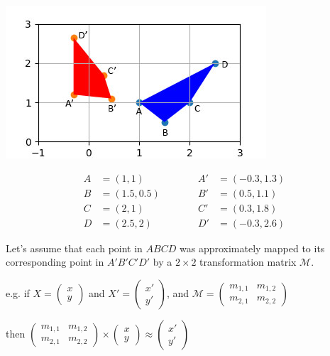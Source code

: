 \includegraphics[width=\textwidth * 5/10]{images/quadrilaterals.jpg}

\begin{equation}
\begin{split}
A&=(1, 1)\\
B&=(1.5, 0.5)\\
C&=(2, 1)\\
D&=(2.5, 2)
\end{split}
\quad\quad\quad
\begin{split}
A'&=(-0.3, 1.3)\\
B'&=(0.5, 1.1)\\
C'&=(0.3, 1.8)\\
D'&=(-0.3, 2.6)
\end{split}
\end{equation}

Let's assume that each point in $ABCD$ was approximately mapped to its corresponding point in $A'B'C'D'$ by a $2\times2$ transformation matrix $\mathcal{M}$.

e.g. if $X = \begin{pmatrix} x \\ y \end{pmatrix}$ and $X' = \begin{pmatrix} x' \\ y' \end{pmatrix}$, and $\mathcal{M} = \begin{pmatrix} m_{1,1} & m_{1,2} \\ m_{2,1} & m_{2,2} \end{pmatrix}$

then $\begin{pmatrix} m_{1,1} & m_{1,2} \\ m_{2,1} & m_{2,2} \end{pmatrix} \times \begin{pmatrix} x \\ y \end{pmatrix} \approx \begin{pmatrix} x' \\ y'  \end{pmatrix}$

